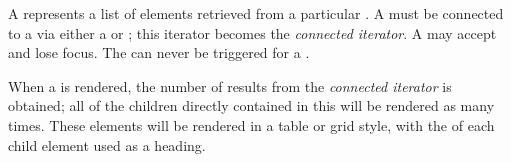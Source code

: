 A  represents a list of elements retrieved from a particular . A  must be connected to a  via either a  or ; this iterator becomes the \textit{connected iterator}. A  may accept and lose focus. The   can never be triggered for a .

When a  is rendered, the number of results from the \textit{connected iterator} is obtained; all of the children directly contained in this  will be rendered as many times. These elements will be rendered in a table or grid style, with the  of each child element used as a heading.
